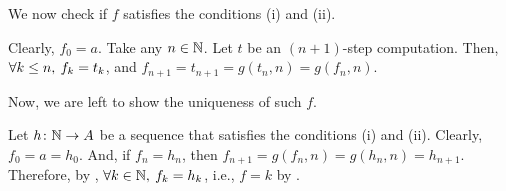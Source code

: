 \documentclass[../introduction_to_set_theory.tex]{subfiles}
\begin{document}
{    \noindent
    We now check if \(f\) satisfies the conditions (i) and (ii).
    \begin{enumerate}[nolistsep, label=(\roman*)]
        \ii
        Clearly, \(f_0 = a\).
        \ii
        Take any \(n \in \NN\).
        Let \(t\) be an \((n+1)\)-step computation.
        Then, \(\forall k \le n,\: f_k = t_k\),
        and \(f_{n+1} = t_{n+1} = g(t_n, n) = g(f_n, n)\).
    \end{enumerate}
    Now, we are left to show the uniqueness of such \(f\).

    Let \(h \colon \NN \to A\) be a sequence that satisfies the conditions (i) and (ii).
    Clearly, \(f_0 = a = h_0\). And, if \(f_n = h_n\),
    then \(f_{n+1} = g(f_n, n) = g(h_n, n) = h_{n+1}\).
    Therefore, by , \(\fall k \in \NN,\: f_k = h_k\),
    i.e., \(f = k\) by .
}
\end{document}
